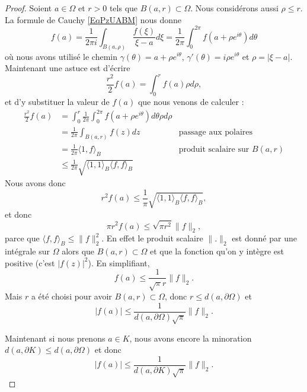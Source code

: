 \begin{proof}
	Soient \( a\in \Omega\) et \( r>0\) tels que \( B(a,r)\subset\Omega\). Nous considérons aussi \( \rho\leq r\). La formule de Cauchy \eqref{EqPzUABM} nous donne
	\begin{equation}
		f(a)=\frac{1}{ 2\pi i }\int_{B(a,\rho)}\frac{ f(\xi) }{ \xi-a }d\xi=\frac{1}{ 2\pi }\int_0^{2\pi}f(a+\rho e^{i\theta})d\theta
	\end{equation}
	où nous avons utilisé le chemin \( \gamma(\theta)=a+\rho e^{i\theta}\), \( \gamma'(\theta)=i\rho e^{i\theta}\) et \( \rho=| \xi-a |\). Maintenant une astuce est d'écrire
	\begin{equation}
		\frac{ r^2 }{2}f(a)=\int_0^rf(a)\rho d\rho,
	\end{equation}
	et d'y substituer la valeur de \( f(a)\) que nous venons de calculer :
	\begin{subequations}
		\begin{align}
			\frac{ r^2 }{2}f(a) & =\int_0^r\frac{1}{ 2\pi }\int_0^{2\pi}f(a+\rho e^{i\theta})d\theta\rho d\rho                                       \\
			                    & =\frac{1}{ 2\pi }\int_{B(a,r)}f(z)dz                                         & \text{passage aux polaires}         \\
			                    & =\frac{1}{ 2\pi }\langle 1, f\rangle_B                                       & \text{produit scalaire sur } B(a,r) \\
			                    & \leq\frac{1}{ 2\pi }\sqrt{\langle 1, 1\rangle_B\langle f, f\rangle_B }
		\end{align}
	\end{subequations}
	Nous avons donc
	\begin{equation}
		r^2f(a)\leq \frac{1}{ \pi }\sqrt{\langle 1, 1\rangle_B\langle f, f\rangle_B},
	\end{equation}
	et donc
	\begin{equation}
		\pi r^2 f(a)\leq \sqrt{\pi r^2}\| f \|_2,
	\end{equation}
	parce que \( \langle f, f\rangle_B\leq \| f \|_2^2\). En effet le produit scalaire \( \| . \|_2\) est donné par une intégrale sur \( \Omega\) alors que \( B(a,r)\subset \Omega\) et que la fonction qu'on y intègre est positive (c'est \( | f(z) |^2\)). En simplifiant,
	\begin{equation}
		f(a)\leq \frac{1}{ \sqrt{\pi}r }\| f \|_2.
	\end{equation}
	Mais \( r\) a été choisi pour avoir \( B(a,r)\subset\Omega\), donc \( r\leq d(a,\partial \Omega)\) et
	\begin{equation}
		| f(a) |\leq \frac{1}{ d(a,\partial\Omega)\sqrt{\pi} }\| f \|_2.
	\end{equation}

	Maintenant si nous prenons \( a\in K\), nous avons encore la minoration \( d(a,\partial K)\leq d(a,\partial \Omega)\) et donc
	\begin{equation}
		| f(a) |\leq\frac{1}{ d(a,\partial K)\sqrt{\pi} }\| f \|_2.
	\end{equation}

\end{proof}

